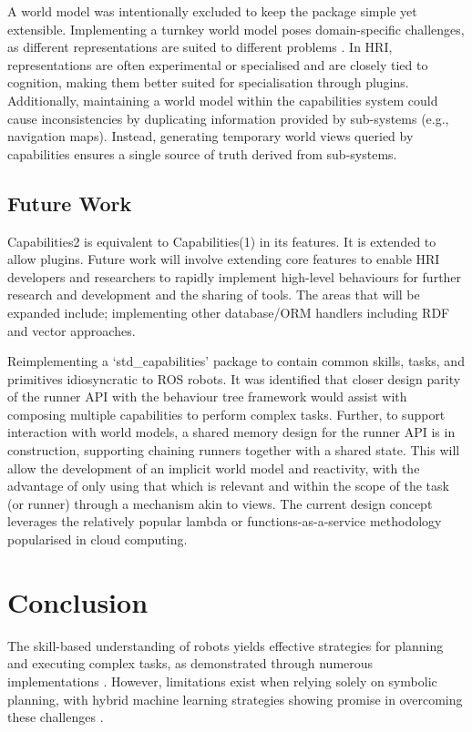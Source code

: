 \documentclass[conference]{IEEEtran}
\begin{document}
A world model was intentionally excluded to keep the package simple yet extensible. Implementing a turnkey world model poses domain-specific challenges, as different representations are suited to different problems \cite{davis2014representations}. In HRI, representations are often experimental or specialised and are closely tied to cognition, making them better suited for specialisation through plugins. Additionally, maintaining a world model within the capabilities system could cause inconsistencies by duplicating information provided by sub-systems (e.g., navigation maps). Instead, generating temporary world views queried by capabilities ensures a single source of truth derived from sub-systems.

\subsection{Future Work}

Capabilities2 is equivalent to Capabilities(1) in its features. It is extended to allow plugins. Future work will involve extending core features to enable HRI developers and researchers to rapidly implement high-level behaviours for further research and development and the sharing of tools. The areas that will be expanded include; implementing other database/ORM handlers including RDF and vector approaches. 

Reimplementing a `std\_capabilities' package to contain common skills, tasks, and primitives idiosyncratic to ROS robots. It was identified that closer design parity of the runner API with the behaviour tree framework would assist with composing multiple capabilities to perform complex tasks. Further, to support interaction with world models, a shared memory design for the runner API is in construction, supporting chaining runners together with a shared state. This will allow the development of an implicit world model and reactivity, with the advantage of only using that which is relevant and within the scope of the task (or runner) through a mechanism akin to views. The current design concept leverages the relatively popular lambda or functions-as-a-service methodology popularised in cloud computing.

\section{Conclusion}

The skill-based understanding of robots yields effective strategies for planning and executing complex tasks, as demonstrated through numerous implementations \cite{colledanchise2021implementation, mayr2023skiros2, pantano2022capability, woodall2014ros}. However, limitations exist when relying solely on symbolic planning, with hybrid machine learning strategies showing promise in overcoming these challenges \cite{yang2019program}.
\end{document}
